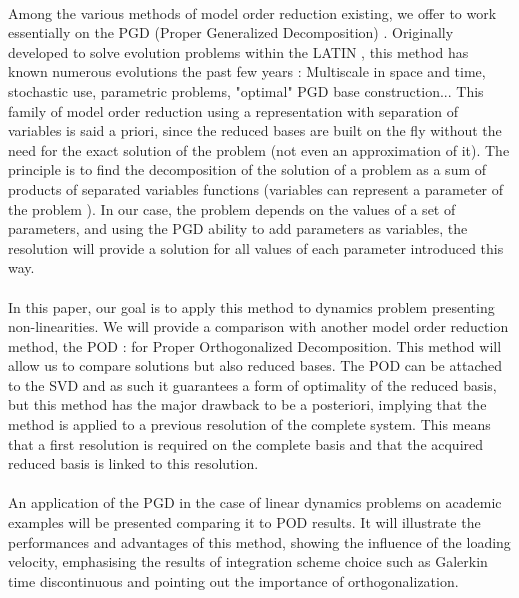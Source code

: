 \documentclass[12pt,a4paper]{article}
\begin{document}
\paragraph*{}
Among the various methods of model order reduction existing, we offer to work essentially on the PGD (Proper Generalized Decomposition) \cite{Creation,ShortReview}. Originally developed to solve evolution problems within the LATIN \cite{Creation}, this method has known numerous evolutions the past few years \cite{ElasticVisco,Parametrized} : Multiscale in space and time, stochastic use, parametric problems, "optimal" PGD base construction... This family of model order reduction using a representation with separation of variables is said a priori, since the reduced bases are built on the fly without the need for the exact solution of the problem (not even an approximation of it). The principle is to find the decomposition of the solution of a problem as a sum of products of separated variables functions (variables can represent a parameter of the problem \cite{Multidimensional}). In our case, the problem depends on the values of a set of parameters, and using the PGD ability to add parameters as variables, the resolution will provide a solution for all values of each parameter introduced this way.\paragraph*{}
In this paper, our goal is to apply this method to dynamics problem presenting non-linearities. We will provide a comparison with another model order reduction method, the POD \cite{Chatterjee} : for Proper Orthogonalized Decomposition. This method will allow us to compare solutions but also reduced bases. The POD can be attached to the SVD and as such it guarantees a form of optimality of the reduced basis, but this method has the major drawback to be a posteriori, implying that the method is applied to a previous resolution of the complete system. This means that a first resolution is required on the complete basis and that the acquired reduced basis is linked to this resolution.
\paragraph*{}
An application of the PGD in the case of linear dynamics problems on academic examples will be presented comparing it to POD results. It will illustrate the performances and advantages of this method, showing the influence of the loading velocity, emphasising the results of integration scheme choice such as Galerkin time discontinuous \cite{GDDisc} and pointing out the importance of orthogonalization.
\end{document}
